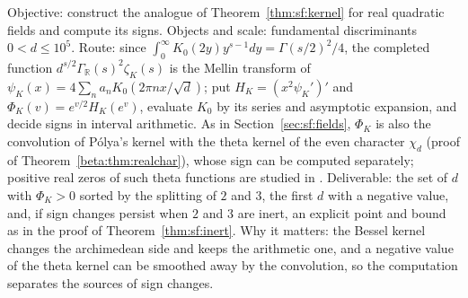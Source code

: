 \begin{compproblem}\label{cp:sfreal}
Objective: construct the analogue of Theorem~\ref{thm:sf:kernel} for real quadratic fields and compute its signs. Objects and scale: fundamental discriminants $0<d\le10^5$. Route: since $\int_0^\infty K_0(2y)y^{s-1}dy=\Gamma(s/2)^2/4$, the completed function $d^{s/2}\Gamma_{\mathbb R}(s)^2\zeta_K(s)$ is the Mellin transform of $\psi_K(x)=4\sum_na_nK_0(2\pi nx/\sqrt d)$; put $H_K=(x^2\psi_K')'$ and $\Phi_K(v)=e^{v/2}H_K(e^v)$, evaluate $K_0$ by its series and asymptotic expansion, and decide signs in interval arithmetic. As in Section~\ref{sec:sf:fields}, $\Phi_K$ is also the convolution of P\'olya's kernel with the theta kernel of the even character $\chi_d$ (proof of Theorem~\ref{beta:thm:realchar}), whose sign can be computed separately; positive real zeros of such theta functions are studied in \cite{louboutinmunsch2013}. Deliverable: the set of $d$ with $\Phi_K>0$ sorted by the splitting of $2$ and $3$, the first $d$ with a negative value, and, if sign changes persist when $2$ and $3$ are inert, an explicit point and bound as in the proof of Theorem~\ref{thm:sf:inert}. Why it matters: the Bessel kernel changes the archimedean side and keeps the arithmetic one, and a negative value of the theta kernel can be smoothed away by the convolution, so the computation separates the sources of sign changes.
\end{compproblem}
